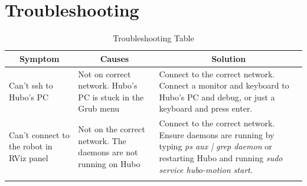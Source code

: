 \documentclass[letterpaper, 10 pt]{report}
\begin{document}
%
\newpage
\chapter{Troubleshooting}\label{chap:troubleshooting}
\begin{table}[ht]
  \centering
  \caption{Troubleshooting Table}
  \begin{tabular}{|p{4.5cm}|p{4.5cm}|p{4.5cm}|} \hline
    \multicolumn{1}{|c|}{Symptom} & \multicolumn{1}{|c|}{Causes} &       \multicolumn{1}{|c|}{Solution} \\ \hline
    Can't ssh to Hubo's PC & Not on correct network. \newline Hubo's PC is stuck in the Grub menu & Connect to the correct network. \newline Connect a monitor and keyboard to Hubo's PC and debug, or just a keyboard and press enter. \\
    \hline
    Can't connect to the robot in RViz panel & Not on the correct network. \newline The daemons are not running on Hubo & Connect to the correct network. \newline Ensure daemons are running by typing \textit{ps aux | grep daemon} or restarting Hubo and running \textit{sudo service hubo-motion start}.  \\
    \hline
     &  &  \\
    \hline
  \end{tabular} \label{tbl:troubleshooting}
\end{table}


%

\end{document}
